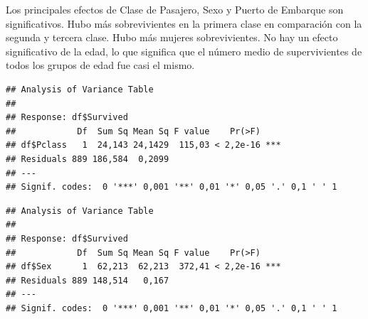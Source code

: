 \documentclass[]{article}
\newenvironment{Shaded}{\begin{snugshade}}{\end{snugshade}}
\newcommand{\KeywordTok}[1]{\textcolor[rgb]{0.13,0.29,0.53}{\textbf{#1}}}
\newcommand{\StringTok}[1]{\textcolor[rgb]{0.31,0.60,0.02}{#1}}
\newcommand{\OperatorTok}[1]{\textcolor[rgb]{0.81,0.36,0.00}{\textbf{#1}}}
\newcommand{\NormalTok}[1]{#1}
\begin{document}
Los principales efectos de Clase de Pasajero, Sexo y Puerto de Embarque
son significativos. Hubo más sobrevivientes en la primera clase en
comparación con la segunda y tercera clase. Hubo más mujeres
sobrevivientes. No hay un efecto significativo de la edad, lo que
significa que el número medio de supervivientes de todos los grupos de
edad fue casi el mismo.

\begin{Shaded}
\end{Shaded}

\begin{verbatim}
## Analysis of Variance Table
## 
## Response: df$Survived
##            Df  Sum Sq Mean Sq F value    Pr(>F)    
## df$Pclass   1  24,143 24,1429  115,03 < 2,2e-16 ***
## Residuals 889 186,584  0,2099                      
## ---
## Signif. codes:  0 '***' 0,001 '**' 0,01 '*' 0,05 '.' 0,1 ' ' 1
\end{verbatim}

\begin{Shaded}
\end{Shaded}

\begin{verbatim}
## Analysis of Variance Table
## 
## Response: df$Survived
##            Df  Sum Sq Mean Sq F value    Pr(>F)    
## df$Sex      1  62,213  62,213  372,41 < 2,2e-16 ***
## Residuals 889 148,514   0,167                      
## ---
## Signif. codes:  0 '***' 0,001 '**' 0,01 '*' 0,05 '.' 0,1 ' ' 1
\end{verbatim}

\begin{Shaded}
\end{Shaded}
\end{document}
